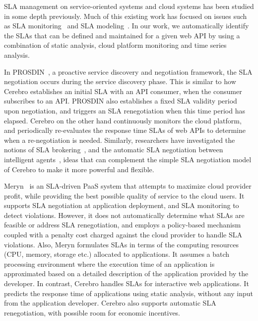 SLA management on service-oriented systems and cloud systems has been 
studied in some depth previously.
Much of this existing work has focused on issues 
such as SLA monitoring~\cite{Michlmayr:2009:CQM:1657755.1657756,Tripathy:2011:MMS:1980822.1980832,Raimondi:2008:EOM:1453101.1453125,Bertolino:2007:SUS:1294904.1294914} and SLA modeling~\cite{Chau:2008:ASM:1463788.1463802,Stamou:2013:SGM:2516588.2516592,Skene:2004:PSL:998675.999422}. 
In our work, we automatically identify the SLAs that can be defined and
maintained 
for a given web API by using a combination of
static analysis, cloud platform monitoring and time series analysis.  

In PROSDIN~\cite{Mahbub:2011:PSN:2061042.2062022}, a proactive service discovery and negotiation
framework, the SLA negotiation occurs during the service discovery phase. This is similar to how
Cerebro establishes an initial SLA with an API consumer, when the consumer subscribes to an API. PROSDIN also
establishes a fixed SLA validity period upon negotiation, and triggers an SLA renegotiation when this time period has 
elapsed. Cerebro on the other hand continuously monitors the cloud platform,
and periodically re-evaluates the response time SLAs of web APIs 
to determine when a re-negotiation is needed.
Similarly, researchers have investigated the notions of SLA brokering~\cite{6546098}, and the automatic SLA negotiation
between intelligent agents~\cite{Yaqub:2014:ONS:2680847.2681496}, ideas that can complement the
simple SLA negotiation model of Cerebro to make it more powerful and flexible.

Meryn~\cite{Dib:2013:MOS:2465823.2465825} is an SLA-driven PaaS system that attempts to maximize cloud
provider profit, while providing the best possible quality of service to the cloud users. It supports
SLA negotiation at application deployment, and SLA monitoring to detect
violations. However, it does not automatically determine what SLAs are
feasible or address SLA renegotiation, 
and employs a policy-based mechanism coupled
with a penalty cost charged against the cloud provider to
handle SLA violations. Also, Meryn formulates SLAs in terms of the computing resources (CPU, memory,
storage etc.) allocated to applications. It assumes a batch processing environment where the
execution time of an application is approximated based on a detailed description of the application provided
by the developer. In contrast, Cerebro handles SLAs for interactive web applications. It predicts
the response time of applications using static analysis, without any input from the application developer. 
Cerebro also supports automatic SLA renegotiation, with possible room for economic incentives.


